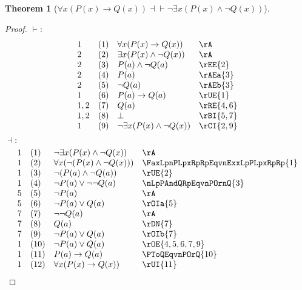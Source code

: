 \documentclass{book}
\theoremstyle{plain}
\newtheorem{theorem}{Theorem}
\theoremstyle{remark}
\theoremstyle{definition}
\begin{document}
\label{FaxLpPLpxRpToQLpxRpRpEqvnExxLpPLpxRpAndnQLpxRpRp}
\begin{theorem}[\(\forall x(P(x)\rightarrow Q(x)) \dashv\vdash \neg\exists x (P(x)\land \neg Q(x))\)]
\end{theorem}
\begin{proof}
	\(\vdash:\)
	\[
	\begin{array}{llll}
		1 & (1) & \forall x(P(x)\rightarrow Q(x)) & \rA \\
		2 & (2) & \exists x(P(x)\wedge \neg Q(x)) & \rA \\
		2 & (3) & P(a)\wedge \neg Q(a) & \rEE{2} \\
		2 & (4) & P(a) & \rAEa{3} \\
		2 & (5) & \neg Q(a) & \rAEb{3} \\
		1 & (6) & P(a)\rightarrow Q(a) & \rUE{1} \\
		1,2 & (7) & Q(a) & \rRE{4,6} \\
		1,2 & (8) & \bot & \rBI{5,7} \\
		1 & (9) & \neg\exists x(P(x)\wedge \neg Q(x)) & \rCI{2,9} \\
	\end{array}
	\]
	\(\dashv:\)
	\[
	\begin{array}{llll}
		1 & (1) & \neg\exists x(P(x)\wedge \neg Q(x)) & \rA \\
		1 & (2) & \forall x(\neg(P(x)\wedge \neg Q(x))) & \FaxLpnPLpxRpRpEqvnExxLpPLpxRpRp{1} \\
		1 & (3) & \neg(P(a)\wedge \neg Q(a)) & \rUE{2} \\
		1 & (4) & \neg P(a)\vee \neg \neg Q(a) & \nLpPAndQRpEqvnPOrnQ{3} \\
		5 & (5) & \neg P(a)& \rA \\
		5 & (6) & \neg P(a)\vee  Q(a) & \rOIa{5} \\
		7 & (7) & \neg \neg Q(a)& \rA \\
		7 & (8) & Q(a)& \rDN{7} \\
		7 & (9) & \neg P(a)\vee  Q(a) & \rOIb{7} \\
		1 & (10) & \neg P(a)\vee  Q(a) & \rOE{4,5,6,7,9} \\
		1 & (11) & P(a)\rightarrow  Q(a) & \PToQEqvnPOrQ{10} \\
		1 & (12) & \forall x(P(x)\rightarrow  Q(x)) & \rUI{11} \\
	\end{array}
	\]
\end{proof}
\end{document}
